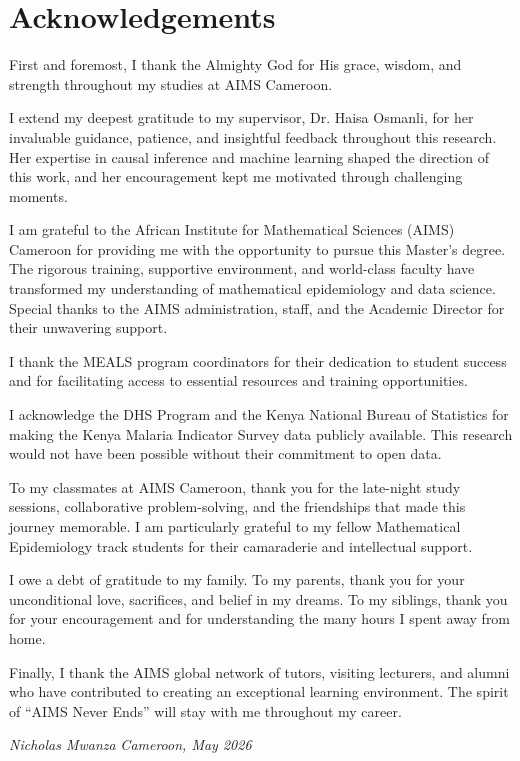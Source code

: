 \chapter*{Acknowledgements}

First and foremost, I thank the Almighty God for His grace, wisdom, and strength throughout my studies at AIMS Cameroon.

I extend my deepest gratitude to my supervisor, Dr. Haisa Osmanli, for her invaluable guidance, patience, and insightful feedback throughout this research. Her expertise in causal inference and machine learning shaped the direction of this work, and her encouragement kept me motivated through challenging moments.

I am grateful to the African Institute for Mathematical Sciences (AIMS) Cameroon for providing me with the opportunity to pursue this Master's degree. The rigorous training, supportive environment, and world-class faculty have transformed my understanding of mathematical epidemiology and data science. Special thanks to the AIMS administration, staff, and the Academic Director for their unwavering support.

I thank the MEALS program coordinators for their dedication to student success and for facilitating access to essential resources and training opportunities.

I acknowledge the DHS Program and the Kenya National Bureau of Statistics for making the Kenya Malaria Indicator Survey data publicly available. This research would not have been possible without their commitment to open data.

To my classmates at AIMS Cameroon, thank you for the late-night study sessions, collaborative problem-solving, and the friendships that made this journey memorable. I am particularly grateful to my fellow Mathematical Epidemiology track students for their camaraderie and intellectual support.

I owe a debt of gratitude to my family. To my parents, thank you for your unconditional love, sacrifices, and belief in my dreams. To my siblings, thank you for your encouragement and for understanding the many hours I spent away from home.

Finally, I thank the AIMS global network of tutors, visiting lecturers, and alumni who have contributed to creating an exceptional learning environment. The spirit of ``AIMS Never Ends'' will stay with me throughout my career.

\textit{Nicholas Mwanza} 
\textit{Cameroon, May 2026}